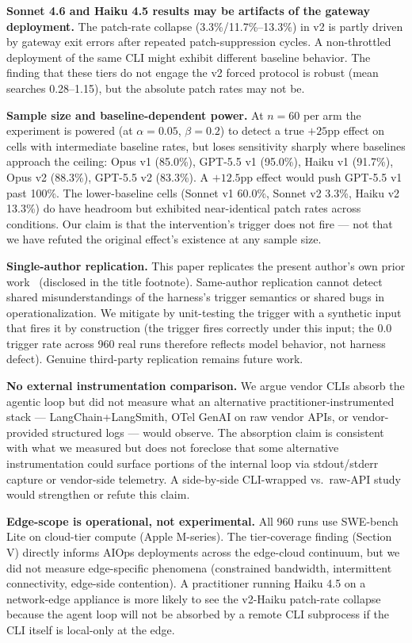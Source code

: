 \documentclass[journal]{IEEEtran}
\begin{document}
\textbf{Sonnet 4.6 and Haiku 4.5 results may be artifacts of the gateway deployment.} The patch-rate collapse (3.3\%/11.7\%--13.3\%) in v2 is partly driven by gateway exit errors after repeated patch-suppression cycles. A non-throttled deployment of the same CLI might exhibit different baseline behavior. The finding that these tiers do not engage the v2 forced protocol is robust (mean searches 0.28--1.15), but the absolute patch rates may not be.

\textbf{Sample size and baseline-dependent power.} At $n{=}60$ per arm the experiment is powered (at $\alpha=0.05$, $\beta=0.2$) to detect a true $+25$pp effect on cells with intermediate baseline rates, but loses sensitivity sharply where baselines approach the ceiling: Opus v1 (85.0\%), GPT-5.5 v1 (95.0\%), Haiku v1 (91.7\%), Opus v2 (88.3\%), GPT-5.5 v2 (83.3\%). A $+12.5$pp effect would push GPT-5.5 v1 past 100\%. The lower-baseline cells (Sonnet v1 60.0\%, Sonnet v2 3.3\%, Haiku v2 13.3\%) do have headroom but exhibited near-identical patch rates across conditions. Our claim is that the intervention's trigger does not fire --- not that we have refuted the original effect's existence at any sample size.

\textbf{Single-author replication.} This paper replicates the present author's own prior work~\cite{aiware2026} (disclosed in the title footnote). Same-author replication cannot detect shared misunderstandings of the harness's trigger semantics or shared bugs in operationalization. We mitigate by unit-testing the trigger with a synthetic input that fires it by construction (the trigger fires correctly under this input; the 0.0 trigger rate across 960 real runs therefore reflects model behavior, not harness defect). Genuine third-party replication remains future work.

\textbf{No external instrumentation comparison.} We argue vendor CLIs absorb the agentic loop but did not measure what an alternative practitioner-instrumented stack --- LangChain+LangSmith, OTel GenAI on raw vendor APIs, or vendor-provided structured logs --- would observe. The absorption claim is consistent with what we measured but does not foreclose that some alternative instrumentation could surface portions of the internal loop via stdout/stderr capture or vendor-side telemetry. A side-by-side CLI-wrapped vs.\ raw-API study would strengthen or refute this claim.

\textbf{Edge-scope is operational, not experimental.} All 960 runs use SWE-bench Lite on cloud-tier compute (Apple M-series). The tier-coverage finding (Section V) directly informs AIOps deployments across the edge-cloud continuum, but we did not measure edge-specific phenomena (constrained bandwidth, intermittent connectivity, edge-side contention). A practitioner running Haiku 4.5 on a network-edge appliance is more likely to see the v2-Haiku patch-rate collapse because the agent loop will not be absorbed by a remote CLI subprocess if the CLI itself is local-only at the edge.
\end{document}
